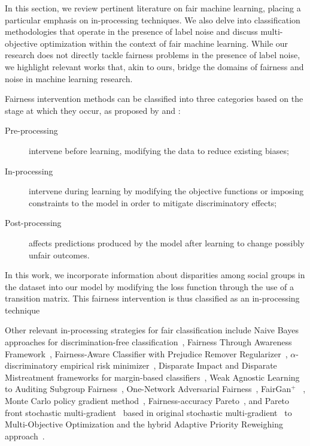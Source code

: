 In this section, we review pertinent literature on fair machine learning, placing a particular emphasis on in-processing techniques. We also delve into classification methodologies that operate in the presence of label noise and discuss multi-objective optimization within the context of fair machine learning. While our research does not directly tackle fairness problems in the presence of label noise, we highlight relevant works that, akin to ours, bridge the domains of fairness and noise in machine learning research. 

Fairness intervention methods can be classified into three categories based on the stage at which they occur, as proposed by \cite{Mehrabi2019} and \cite{AlerTubella2022}:

\begin{description}
    \item[Pre-processing] intervene before learning, modifying the data to reduce existing biases;
    \item[In-processing] intervene during learning by modifying the objective functions or imposing constraints to the model in order to mitigate discriminatory effects;
    \item[Post-processing] affects predictions produced by the model after learning to change possibly unfair outcomes. 
\end{description}
In this work, we incorporate information about disparities among social groups in the dataset into our model by modifying the loss function through the use of a transition matrix. This fairness intervention is thus classified as an in-processing technique 

Other relevant in-processing strategies for fair classification include Naive Bayes approaches for discrimination-free classification~\citep{Calders2010}, Fairness Through Awareness Framework~\citep{Dwork2011}, Fairness-Aware Classifier with Prejudice Remover Regularizer~\cite{Kamishima2012}, $\alpha$-discriminatory empirical risk minimizer~\citep{Woodworth2017}, Disparate Impact and Disparate Mistreatment frameworks for margin-based classifiers~\citep{Zafar2017a,Zafar2017b}, Weak Agnostic Learning to Auditing Subgroup Fairness~\citep{pmlr-v80-kearns18a,Kearns2018}, One-Network Adversarial Fairness~\citep{Adel2019}, FairGan$^{+}$ ~\citep{Xu2019}, Monte Carlo policy gradient method~\citep{Petrovic2021}, Fairness-accuracy Pareto~\citep{Wei2022}, and Pareto front stochastic multi-gradient~\citep{Liu2022} based in original stochastic multi-gradient~\citep{Mercier2018} to Multi-Objective Optimization and the hybrid Adaptive Priority Reweighing approach~\cite{HuXT23}.

